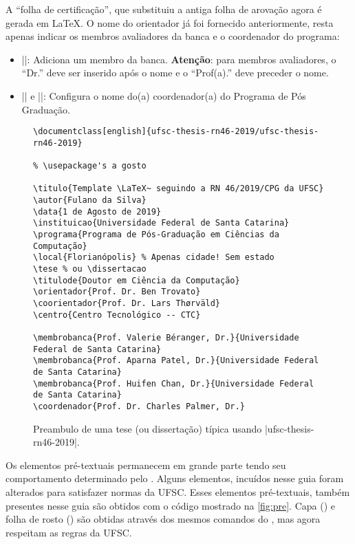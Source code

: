 \documentclass[]{ufsc-thesis-rn46-2019}
\begin{document}
A ``folha de certificação'', que substituiu a antiga folha de arovação agora é gerada em \LaTeX. O nome do orientador já foi fornecido anteriormente, resta apenas indicar os membros avaliadores da banca e o coordenador do programa:
\begin{itemize}
\item \mt||: Adiciona um membro da banca. \textbf{Atenção}: para membros avaliadores, o ``Dr.'' deve ser inserido após o nome e o ``Prof(a).'' deve preceder o nome.
\item \mt|\coordenador| e \mt|\coordenadora|: Configura o nome do(a) coordenador(a) do Programa de Pós Graduação.
\end{itemize}

\begin{figure}[tb]
  \centering
  \caption{Preambulo de uma tese (ou dissertação) típica usando \mt|ufsc-thesis-rn46-2019|.}
  \label{fig:preambulo}
  \begin{verbatim}
\documentclass[english]{ufsc-thesis-rn46-2019/ufsc-thesis-rn46-2019}

% \usepackage's a gosto

\titulo{Template \LaTeX~ seguindo a RN 46/2019/CPG da UFSC}
\autor{Fulano da Silva}
\data{1 de Agosto de 2019}
\instituicao{Universidade Federal de Santa Catarina}
\programa{Programa de Pós-Graduação em Ciências da Computação}
\local{Florianópolis} % Apenas cidade! Sem estado
\tese % ou \dissertacao
\titulode{Doutor em Ciência da Computação}
\orientador{Prof. Dr. Ben Trovato}
\coorientador{Prof. Dr. Lars Thørväld}
\centro{Centro Tecnológico -- CTC}

\membrobanca{Prof. Valerie Béranger, Dr.}{Universidade Federal de Santa Catarina}
\membrobanca{Prof. Aparna Patel, Dr.}{Universidade Federal de Santa Catarina}
\membrobanca{Prof. Huifen Chan, Dr.}{Universidade Federal de Santa Catarina}
\coordenador{Prof. Dr. Charles Palmer, Dr.}
  \end{verbatim}
\end{figure}

Os elementos pré-textuais permanecem em grande parte tendo seu comportamento determinado pelo \abnTeX. Alguns elementos, incuídos nesse guia foram alterados para satisfazer normas da UFSC. Esses elementos pré-textuais, também presentes nesse guia são obtidos com o código mostrado na \autoref{fig:pre}. Capa (\imprimircapa) e folha de rosto (\imprimirfolhaderosto*) são obtidas através dos mesmos comandos do \abnTeX, mas agora respeitam as regras da UFSC. 
\end{document}
